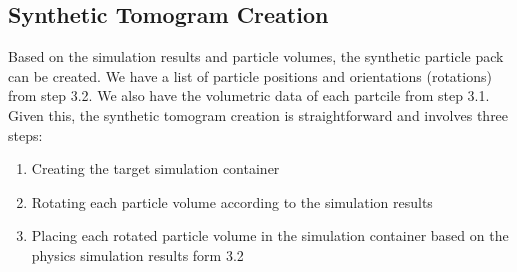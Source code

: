 \documentclass[preprint,12pt]{elsarticle}
\begin{document}
\subsection{Synthetic Tomogram Creation}
Based on the simulation results and particle volumes, the synthetic particle pack can be created. 
We have a list of particle positions and orientations (rotations) from step 3.2.
We also have the volumetric data of each partcile from step 3.1. 
Given this, the synthetic tomogram creation is straightforward and involves three steps:
\begin{enumerate}
    \item Creating the target simulation container
    \item Rotating each particle volume according to the simulation results
    \item Placing each rotated particle volume in the simulation container based on the physics simulation results form 3.2
\end{enumerate}
\end{document}
